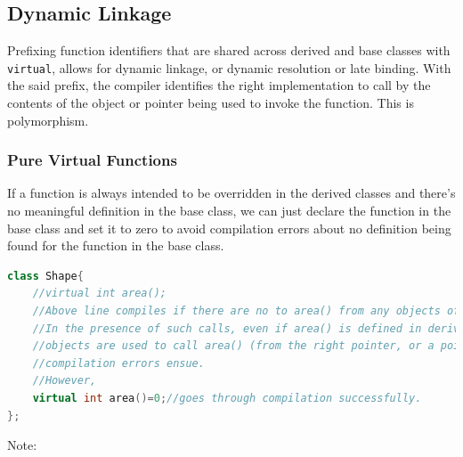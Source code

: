\documentclass{report}
\begin{document}
\subsection{Dynamic Linkage}
Prefixing function identifiers that are shared across derived and base classes with \texttt{virtual}, allows for dynamic linkage, or dynamic resolution or late binding. With the said prefix, the compiler identifies the right implementation to call by the contents of the object or pointer being used to invoke the function. This is polymorphism.
\subsubsection{Pure Virtual Functions}
If a function is always intended to be overridden in the derived classes and there's no meaningful definition in the base class,
we can just declare the function in the base class and set it to zero to avoid compilation errors about no definition being found for
the function in the base class.
\begin{lstlisting}[language=C++]
class Shape{
    //virtual int area();
    //Above line compiles if there are no to area() from any objects of shape/derived classes.
    //In the presence of such calls, even if area() is defined in derived classes and their
    //objects are used to call area() (from the right pointer, or a pointer of type Shape*)
    //compilation errors ensue.
    //However,
    virtual int area()=0;//goes through compilation successfully.
};
\end{lstlisting}
Note:
\end{document}
